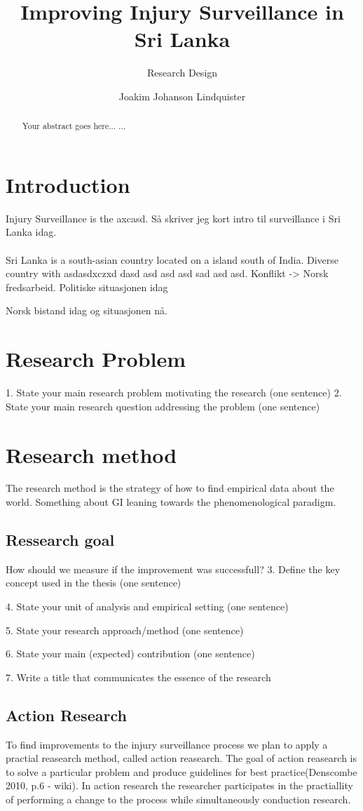 \documentclass[UKenglish]{article}
\title{Improving Injury Surveillance in Sri Lanka}
\subtitle{Research Design}
\author{Joakim Johanson Lindquister}
\begin{document}
\ififorside{}
\begin{abstract}
Your abstract goes here...
...
\end{abstract}
\section*{Introduction} 
Injury Surveillance is the axcasd. Så skriver jeg kort intro til surveillance i Sri Lanka idag. 
\\ \\
Sri Lanka is a south-asian country located on a island south of India. Diverse country with asdasdxczxd dasd asd asd asd sad asd asd. Konflikt -> Norsk fredsarbeid. Politiske situasjonen idag

Norsk bistand idag og situasjonen nå. 


\section*{Research Problem}
1. State your main research problem motivating the research (one sentence)
2. State your main research question addressing the problem (one sentence)

\section*{Research method}
The research method is the strategy of how to find empirical data about the world. Something about GI leaning towards the phenomenological paradigm.
\subsection{Ressearch goal}
How should we measure if the improvement was successfull?
3. Define the key concept used in the thesis (one sentence)

4. State your unit of analysis and empirical setting (one sentence)

5. State your research approach/method (one sentence)

6. State your main (expected) contribution (one sentence)

7. Write a title that communicates the essence of the research

\subsection{Action Research}
To find improvements to the injury surveillance process we plan to apply a practial reasearch method, called action reasearch. The goal of action reasearch is to solve a particular problem and produce guidelines for best practice(Denscombe 2010, p.6 - wiki). In action research the researcher participates in the practiallity of performing a change to the process while simultaneously conduction research.
\end{document}

